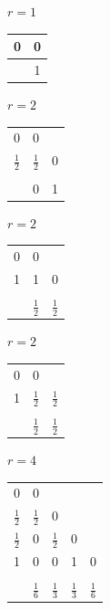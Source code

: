 \documentclass[10pt,a4paper]{article}
\begin{document}
\begin{bsp}
$r=1$
\begin{table}[H]
\centering
\begin{tabular}{c| c}
0 & 0\\
\hline
& 1
\end{tabular}
\end{table}
\end{bsp}

\begin{bsp}
$r=2$
\begin{table}[H]
\centering
\begin{tabular}{c| c c}
0 & 0 &\\
$\frac{1}{2}$ & $\frac{1}{2}$ & 0 \\
\hline \\
 & 0 & 1
\end{tabular}
\end{table}
\end{bsp}

\begin{bsp}
$r=2$
\begin{table}[H]
\centering
\begin{tabular}{c| c c}
0 & 0 &\\
1 & 1 & 0 \\
\hline \\
 & $\frac{1}{2}$& $\frac{1}{2}$
\end{tabular}
\end{table}
\end{bsp}

\begin{bsp}
$r=2$
\begin{table}[H]
\centering
\begin{tabular}{c| c c}
0 & 0 &\\
1 & $\frac{1}{2}$ & $\frac{1}{2}$ \\
\hline \\
 & $\frac{1}{2}$& $\frac{1}{2}$
\end{tabular}
\end{table}
\end{bsp}


\begin{bsp}
$r=4$
\begin{table}[H]
\centering
\begin{tabular}{c| c c c c}
0 & 0 &\\
$\frac{1}{2}$ & $\frac{1}{2}$ & 0 \\
$\frac{1}{2}$ & 0 & $\frac{1}{2}$ & 0 & \\
1 & 0 & 0 &1 & 0 \\
\hline \\
 & $\frac{1}{6}$ & $\frac{1}{3}$ & $\frac{1}{3}$ & $\frac{1}{6}$
\end{tabular}
\end{table}
\end{bsp}
\end{document}

